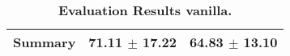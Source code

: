 \begin{table}[htb]
{\begin{tabular}{lll}
\midrule
\textbf{Summary                                  } &                  \phantom{0}71.11 $\pm$ 17.22 &                      \phantom{0}64.83 $\pm$ 13.10 \\
\bottomrule
\end{tabular}%
}
\caption{\textbf{Evaluation Results vanilla.}}
\label{tab:eval-results}
\end{table}

